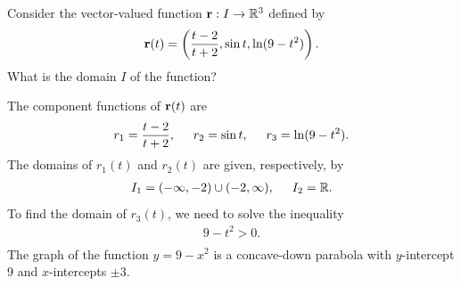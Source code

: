 \documentclass[12pt,letterpaper,reqno]{article}
\numberwithin{equation}{section}
\newcommand{\R}{\ensuremath{\mathbb R}}
\newcommand{\bbr}{{\bf r}}
\begin{document}
{\begin{exercise}
	Consider the vector-valued function $\bbr:I \to \mathbb{R}^3$ defined by
	\begin{align*}
		\bbr(t)=\left(\frac{t-2}{t+2},\sin t, \ln(9-t^2)\right).
	\end{align*}
What is the domain $I$ of the function?
\end{exercise}
{\color{red}\begin{solution}
	The component functions of $\bbr(t)$ are 
	\begin{align*}
		r_1=\frac{t-2}{t+2}, \hspace{0.5cm} r_2=\sin t, \hspace{0.5cm} r_3=\ln(9-t^2).
	\end{align*}
	The domains of $r_1(t)$ and $r_2(t)$ are given, respectively, by
	\begin{align*}
		I_1=(-\infty,-2) \cup (-2,\infty), \hspace{0.5cm} I_2=\R.
	\end{align*}
	To find the domain of $r_3(t)$, we need to solve the inequality
	\begin{align*}
		9-t^2>0. \\
	\end{align*}
	The graph of the function $y=9-x^2$ is a concave-down parabola with $y$-intercept 9 and $x$-intercepts $\pm 3$. 
	

\end{solution}}}
\end{document}
